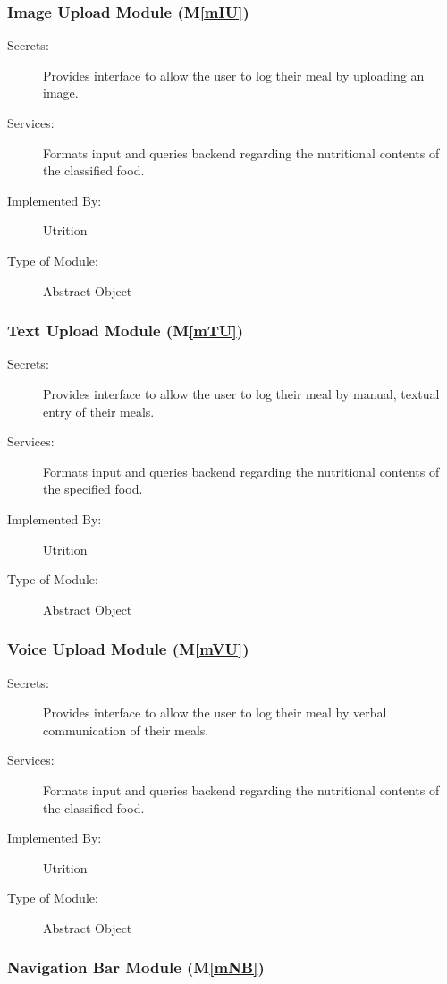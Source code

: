 \documentclass[12pt, titlepage]{article}
\newcommand{\mref}[1]{M\ref{#1}}
\begin{document}
\subsubsection{Image Upload Module (\mref{mIU})}

\begin{description}
	\item[Secrets:]Provides interface to allow the user to log their meal by 
	uploading an image.
	\item[Services:]Formats input and queries backend regarding the nutritional 
	contents of the classified food.
	\item[Implemented By:] Utrition
	\item[Type of Module:] Abstract Object
\end{description}

\subsubsection{Text Upload Module (\mref{mTU})}

\begin{description}
	\item[Secrets:]Provides interface to allow the user to log their meal by manual, textual 
	entry of their meals.
	\item[Services:]Formats input and queries backend regarding the nutritional 
	contents of the specified food.
	\item[Implemented By:] Utrition
	\item[Type of Module:] Abstract Object
\end{description}

\subsubsection{Voice Upload Module (\mref{mVU})}

\begin{description}
	\item[Secrets:]Provides interface to allow the user to log their meal by verbal 
	communication of their meals.
	\item[Services:]Formats input and queries backend regarding the nutritional 
	contents of the classified food.
	\item[Implemented By:] Utrition
	\item[Type of Module:] Abstract Object
\end{description}

\subsubsection{Navigation Bar Module (\mref{mNB})}
\end{document}
